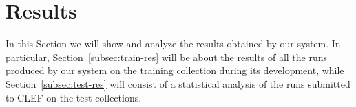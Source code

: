 \section{Results}
\label{sec:results}

In this Section we will show and analyze the results obtained by our system.
In particular, Section~\ref{subsec:train-res} will be about the results of all the runs produced by our system on the training collection during its development, while Section~\ref{subsec:test-res} will consist of a statistical analysis of the runs submitted to \ac{CLEF} on the test collections.



